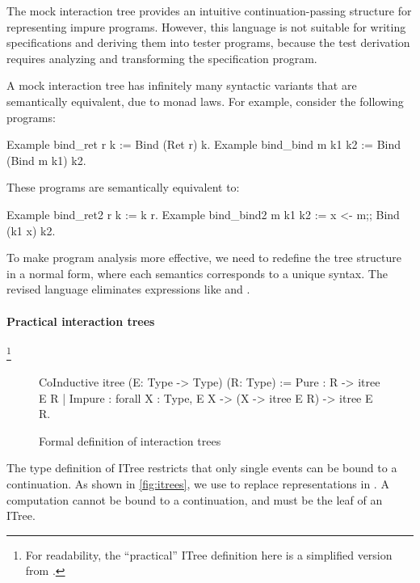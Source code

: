 The mock interaction tree provides an intuitive continuation-passing structure
for representing impure programs.  However, this language is not suitable for
writing specifications and deriving them into tester programs, because the test
derivation requires analyzing and transforming the specification program.

A mock interaction tree has infinitely many syntactic variants that are
semantically equivalent, due to monad laws.  For example, consider the following
programs:
\begin{coq}
  Example bind_ret  r k     := Bind (Ret r) k.
  Example bind_bind m k1 k2 := Bind (Bind m k1) k2.
\end{coq}
These programs are semantically equivalent to:
\begin{coq}
  Example bind_ret2  r k     := k r.
  Example bind_bind2 m k1 k2 := x <- m;; Bind (k1 x) k2.
\end{coq}

To make program analysis more effective, we need to redefine the tree structure
in a normal form, where each semantics corresponds to a unique syntax.  The
revised language eliminates expressions like  and .

\paragraph{Practical interaction trees}
\footnote{For readability, the ``practical'' ITree definition here is a
  simplified version from \textcite{itree}.}
\begin{figure}
\begin{coq}
  CoInductive itree (E: Type -> Type) (R: Type) :=
    Pure   : R -> itree E R
  | Impure : forall {X : Type}, E X -> (X -> itree E R) -> itree E R.
\end{coq}
\caption{Formal definition of interaction trees}
\label{fig:itrees}
\end{figure}
The type definition of ITree restricts that only single events can be bound to a
continuation.  As shown in \autoref{fig:itrees}, we use  to
replace  representations in .  A
 computation cannot be bound to a continuation, and must be the leaf
of an ITree.

